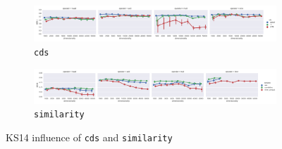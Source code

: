 \begin{figure}
  \centering

  \begin{subfigure}[t]{\textwidth}
    \includegraphics[width=1.1\textwidth]{supplement/figures/KS14-interaction-cds}

  \caption{\texttt{cds}}
  \label{fig:ks14-cds}
  \end{subfigure}

  \begin{subfigure}[t]{\textwidth}
    \includegraphics[width=1.1\textwidth]{supplement/figures/KS14-interaction-similarity}

  \caption{\texttt{similarity}}
  \label{fig:ks14-similarity}
  \end{subfigure}

  \caption{KS14 influence of \texttt{cds} and \texttt{similarity}}
\end{figure}
